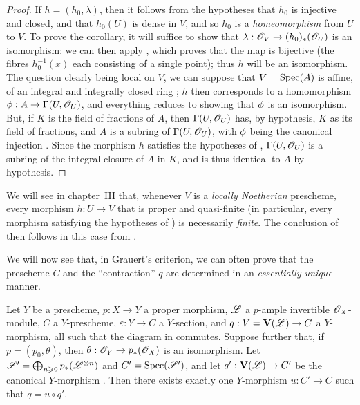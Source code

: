 \begin{proof}
If $h=(h_0,\lambda)$, then it follows from the hypotheses that $h_0$ is injective and closed, and that $h_0(U)$
is dense in $V$, and so $h_0$ is a \emph{homeomorphism} from $U$ to $V$.
To prove the corollary, it will suffice to show that $\lambda:\sh{O}_V\to(h_0)_*(\sh{O}_U)$ is an isomorphism: we can then apply , which proves that the map  is bijective (the fibres $h_0^{-1}(x)$ each consisting of a single point);
thus $h$ will be an isomorphism.
The question clearly being local on $V$, we can suppose that $V=\operatorname{Spec}(A)$ is affine, of an integral and integrally closed ring ;
$h$ then corresponds  to a homomorphism $\vphi:A\to\Gamma(U,\sh{O}_U)$, and everything reduces to showing that $\phi$ is an isomorphism.
But, if $K$ is the field of fractions of $A$, then $\Gamma(U,\mathscr{O}_U)$ has, by hypothesis, $K$ as its field of fractions, and $A$ is a subring of $\Gamma(U,\mathscr{O}_U)$, with $\phi$ being the canonical injection .
Since the morphism $h$ satisfies the hypotheses of , $\Gamma(U,\mathscr{O}_U)$ is a subring of the integral closure of $A$ in $K$, and is thus identical to $A$ by hypothesis.
\end{proof}

\begin{remark}[8.11.3]
\label{II.8.11.3}
We will see in chapter~III  that, whenever $V$ is a \emph{locally Noetherian} prescheme, every morphism $h:U\to V$ that is proper and quasi-finite (in particular, every morphism satisfying the hypotheses of ) is necessarily \emph{finite}.
The conclusion of  then follows in this case from .
\end{remark}

\begin{env}[8.11.4]
\label{II.8.11.4}
We will now see that, in Grauert's criterion, we can often prove that the prescheme $C$ and the ``contraction'' $q$ are determined in an \emph{essentially unique} manner.
\end{env}

\begin{lemma}[8.11.5]
\label{II.8.11.5}
Let $Y$ be a prescheme, $p:X\to Y$ a proper morphism, $\mathscr{L}$ a $p$-ample invertible $\mathscr{O}_X$-module, $C$ a $Y$-prescheme, $\varepsilon:Y\to C$ a $Y$-section, and $q:V=\bb{V}(\sh{L})\to C$ a $Y$-morphism, all such that the diagram in  commutes.
Suppose further that, if $p=(p_0,\theta)$, then $\theta:\sh{O}_Y\to p_*(\sh{O}_X)$ is an isomorphism.
Let $\mathscr{S}'=\bigoplus_{n\geqslant0}p_*(\mathscr{L}^{\otimes n})$ and $C'=\operatorname{Spec}(\mathscr{S}')$, and let $q':\bb{V}(\sh{L})\to C'$ be the canonical $Y$-morphism .
Then there exists exactly one $Y$-morphism $u:C'\to C$ such that $q=u\circ q'$.
\end{lemma}

